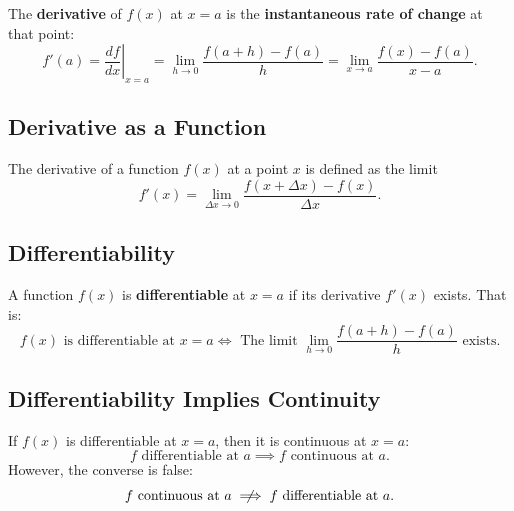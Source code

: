 \documentclass[a4paper,11pt]{article}
\theoremstyle{definition}
\theoremstyle{plain}
\theoremstyle{remark}
\begin{document}
\begin{tcolorbox}
    The \textbf{derivative} of \( f(x) \) at \( x = a \) is the \textbf{instantaneous rate of change} at that point:
    \[
    f'(a) = \left. \frac{df}{dx} \right|_{x=a} =\lim\limits_{h \to 0} \frac{f(a + h) - f(a)}{h} = \lim\limits_{x \to a} \frac{f(x) - f(a)}{x - a}.
    \]
\end{tcolorbox}




\subsection{Derivative as a Function}

\begin{tcolorbox}
    The derivative of a function \( f(x) \) at a point \( x \) is defined as the limit
    \[
    f'(x) = \lim_{\Delta x \to 0} \frac{f(x + \Delta x) - f(x)}{\Delta x}.
    \]
\end{tcolorbox}




\subsection{Differentiability}

\begin{tcolorbox}
    A function \( f(x) \) is \textbf{differentiable} at \( x = a \) if its derivative \( f'(x) \) exists. That is:  
    \[
    f(x) \text{ is differentiable at } x = a \iff \text{ The limit } \lim\limits_{h \to 0} \frac{f(a+h) - f(a)}{h} \text{ exists.}
    \]
\end{tcolorbox}




\subsection{Differentiability Implies Continuity}

\begin{tcolorbox}
    If \( f(x) \) is differentiable at \( x = a \), then it is continuous at \( x = a: \)
    \[
    f \text{ differentiable at } a \implies f \text{ continuous at } a.
    \]
    However, the converse is false:
    \[
    f \text{ continuous at } a \centernot\implies f \text{ differentiable at } a.
    \]
\end{tcolorbox}


\end{document}
